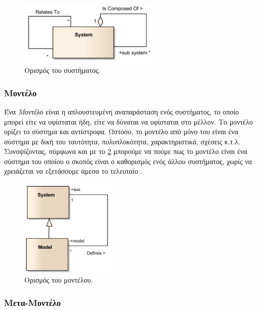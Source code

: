 \begin{figure}[!ht]
	\centering
	\includegraphics[width=0.6\textwidth]{./images/chapter2/system.png}
	\caption{Ορισμός του συστήματος.}
	\label{fig:system}
\end{figure}

\subsubsection{Μοντέλο}
\label{subsubsec:model}

Ένα \textit{Μοντέλο} είναι η απλουστευμένη αναπαράσταση ενός συστήματος, το οποίο μπορεί είτε να υφίσταται ήδη, είτε να δύναται να υφίσταται στο μέλλον. Το μοντέλο ορίζει το σύστημα και αντίστροφα. Ωστόσο, το μοντέλο από μόνο του είναι ένα σύστημα με δική του ταυτότητα, πολυπλοκότητα, χαρακτηριστικά, σχέσεις κ.τ.λ. Συνοψίζοντας, σύμφωνα και με το \ref{fig:model} μπορούμε να πούμε πως το μοντέλο είναι ένα σύστημα του οποίου ο σκοπός είναι ο καθορισμός ενός άλλου συστήματος, χωρίς να χρειάζεται να εξετάσουμε άμεσα το τελευταίο \cite{bib:rodrigues_2015}.

\begin{figure}[!ht]
	\centering
	\includegraphics[width=0.4\textwidth]{./images/chapter2/model.png}
	\caption{Ορισμός του μοντέλου.}
	\label{fig:model}
\end{figure}

\subsubsection{Μετα-Μοντέλο}
\label{subsubsec:metamodel}

